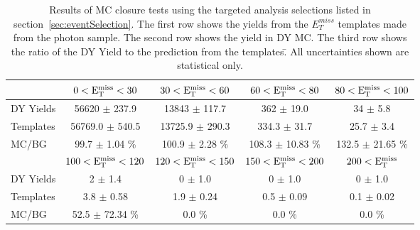 \begin{table}[htb]
\scriptsize
\begin{center}
\caption{\label{table:targeted} Results of MC closure tests using the targeted analysis selections listed in section~\ref{sec:eventSelection}. The first row shows the yields from the $E^{miss}_T$ templates made from the photon sample. The second row shows the yield in DY MC. The third row shows the ratio of the DY Yield to the prediction from the templates.̄ All uncertainties shown are statistical only. }
\begin{tabular}{l|c|c|c|c}
\hline
\hline
          & $0 < \rm{E_{T}^{miss}} < 30$  & $30 < \rm{E_{T}^{miss}} < 60$  & $60 < \rm{E_{T}^{miss}} < 80$  & $80 < \rm{E_{T}^{miss}} < 100$  \\ 
\hline
DY Yields & 56620 $\pm$ 237.9 & 13843 $\pm$ 117.7 &   362 $\pm$ 19.0 &     34 $\pm$ 5.8 \\
Templates & 56769.0 $\pm$ 540.5 & 13725.9 $\pm$ 290.3 & 334.3 $\pm$ 31.7 &  25.7 $\pm$ 3.4 \\
    MC/BG & 99.7 $\pm$ 1.04 \% & 100.9 $\pm$ 2.28 \% & 108.3 $\pm$ 10.83 \% & 132.5 $\pm$ 21.65 \% \\
\hline
\hline
          & $100 < \rm{E_{T}^{miss}} < 120$  & $120 < \rm{E_{T}^{miss}} < 150$  & $150 < \rm{E_{T}^{miss}} < 200$  &    $200 < \rm{E_{T}^{miss}}$  \\ 
\hline
DY Yields &      2 $\pm$ 1.4 &      0 $\pm$ 1.0 &      0 $\pm$ 1.0 &      0 $\pm$ 1.0 \\
Templates &   3.8 $\pm$ 0.58 &   1.9 $\pm$ 0.24 &   0.5 $\pm$ 0.09 &   0.1 $\pm$ 0.02 \\
    MC/BG & 52.5 $\pm$ 72.34 \% & 0.0 \% & 0.0 \% & 0.0 \% \\
\hline
\hline
\end{tabular}
\end{center}
\end{table}

\clearpage
